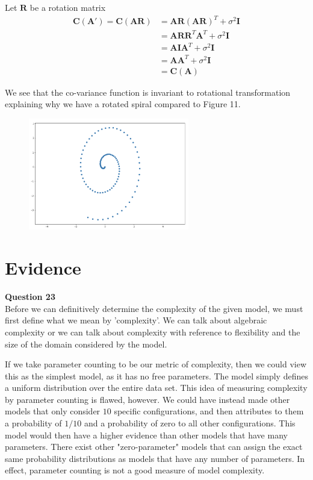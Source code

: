 \documentclass[10pt, a4paper, twocolumn]{article} %
\begin{document}
\begin{enumerate}
  Let $\mathbf{R}$ be a rotation matrix
  \begin{align}
      \mathbf{C}(\mathbf{A'}) = \mathbf{C}(\mathbf{A}\mathbf{R}) &= \mathbf{A}\mathbf{R}(\mathbf{A}\mathbf{R})^T + \sigma^2\mathbf{I}\\
      &= \mathbf{A}\mathbf{R}\mathbf{R}^T\mathbf{A}^T + \sigma^2\mathbf{I}\\
      &= \mathbf{A}\mathbf{I}\mathbf{A}^T + \sigma^2\mathbf{I}\\
      &= \mathbf{A}\mathbf{A}^T + \sigma^2\mathbf{I}\\
      &= \mathbf{C}(\mathbf{A})
  \end{align}
  
  We see that the co-variance function is invariant to rotational transformation explaining why we have a rotated spiral compared to Figure 11.
  
 \begin{figure}[H]
      \centering
      \includegraphics[width=70mm,scale=0.5]{images/Q22.png}
      \label{fig:Q20_graph_1}
      \caption{}
  \end{figure}
  
\section{Evidence}
  
  \textbf{Question 23}\\
  Before we can definitively determine the complexity of the given model, we must first define what we mean by 'complexity'. We can talk about algebraic complexity or we can talk about complexity with reference to flexibility and the size of the domain considered by the model.

  If we take parameter counting to be our metric of complexity, then we could view this as the simplest model, as it has no free parameters. The model simply defines a uniform distribution over the entire data set. This idea of measuring complexity by parameter counting is flawed, however. We could have instead made other models that only consider $10$ specific configurations, and then attributes to them a probability of $1/10$ and a probability of zero to all other configurations. This model would then have a higher evidence than other models that have many parameters. There exist other "zero-parameter" models that can assign the exact same probability distributions as models that have any number of parameters. In effect, parameter counting is not a good measure of model complexity.
  

\end{enumerate}
\end{document}
